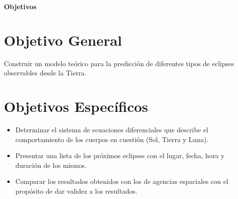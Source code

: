 \setcounter{section}{0}
\begin{singlespace}%

\huge{\textbf{Objetivos}} 

\normalsize

\section{Objetivo General}
\hspace{1 cm} Construir un modelo teórico para la predicción de diferentes tipos de eclipses observables desde la Tierra.
\section{Objetivos Específicos}
\normalsize

\begin{itemize}
    
    \item Determinar el sistema de ecuaciones diferenciales que describe el comportamiento de los cuerpos en cuestión (Sol, Tierra y Luna).
    
    \item Presentar una lista de los próximos eclipses con el lugar, fecha, hora y duración de los mismos.
    
    \item Comparar los resultados obtenidos con los de agencias espaciales con el propósito de dar validez a los resultados.

\end{itemize}

\end{singlespace}




